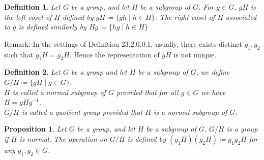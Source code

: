 \documentclass[11pt]{book}
\theoremstyle{break}
\theoremstyle{break}
\newtheorem{prop}[lem]{Proposition}
\newtheorem{defn}{Definition}[corL]
\newcommand{\remark}{\color{blue}Remark: \color{black}}
\begin{document}
\begin{defn}
Let $G$ be a group, and let $H$ be a subgroup of $G$. For $g\in G$, $gH$ is the left coset of $H$ defined by $gH\coloneqq \{gh \mid h \in H\}$. The right coset of $H$ associated to $g$ is defined similarly by $Hg\coloneqq \{hg \mid h \in H\}$
\end{defn}
\remark In the settings of Definition 23.2.0.0.1, usually, there exists distinct $g_1,g_2$ such that $g_1H = g_2H$. Hence the representation of $gH$ is not unique.

\begin{defn}
Let $G$ be a group and let $H$ be a subgroup of $G$, we define $G/H \coloneqq \{ gH \mid g \in G\}$. \\
$H$ is called a normal subgroup of $G$ provided that for all $g \in G$ we have $H = gHg^{-1}$. \\
$G/H$ is called a quotient group provided that $H$ is a normal subgroup of $G$. 
\end{defn}

\begin{prop}
Let $G$ be a group, and let $H$ be a subgroup of $G$. $G/H$ is a group if $H$ is normal. The operation on $G/H$ is defined by $(g_1H)(g_2H) \coloneqq g_1g_2H$ for any $g_1,g_2 \in G$. 
\end{prop}
\end{document}

